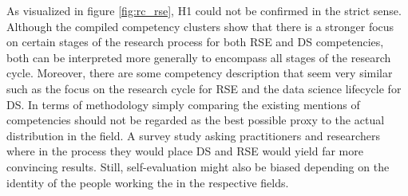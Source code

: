 \documentclass[
        english,biblatex
    ]{lni}
\begin{document}
    As visualized in figure \ref{fig:rc_rse}, H1 could not be confirmed
    in the strict sense. Although the compiled competency clusters show
    that there is a stronger focus on certain stages of the research
    process for both RSE and DS competencies, both can be interpreted
    more generally to encompass all stages of the research cycle.
    Moreover, there are some competency description that seem very
    similar such as the focus on the research cycle for RSE and the data
    science lifecycle for DS. In terms of methodology simply comparing
    the existing mentions of competencies should not be regarded as the
    best possible proxy to the actual distribution in the field. A
    survey study asking practitioners and researchers where in the
    process they would place DS and RSE would yield far more convincing
    results. Still, self-evaluation might also be biased depending on
    the identity of the people working the in the respective fields.
\end{document}
